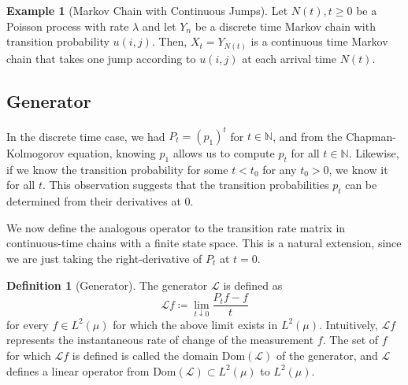 \documentclass{article}
\theoremstyle{definition}
\newtheorem{example}{Example}[section]
\theoremstyle{remark}
\theoremstyle{definition}
\newtheorem{definition}{Definition}[section]
\begin{document}
  \begin{example}[Markov Chain with Continuous Jumps]
  Let $N(t), t \geq 0$ be a Poisson process with rate $\lambda$ and let $Y_n$ be a discrete time Markov chain with transition probability $u(i, j)$. Then, $X_t = Y_{N(t)}$ is a continuous time Markov chain that takes one jump according to $u(i, j)$ at each arrival time $N(t)$. 
  \end{example}


  \subsection{Generator}

    In the discrete time case, we had $P_t = (p_1)^t$ for $t \in \mathbb{N}$, and from the Chapman-Kolmogorov equation, knowing $p_1$ allows us to compute $p_t$ for all $t \in \mathbb{N}$. Likewise, if we know the transition probability for some $t < t_0$ for any $t_0 > 0$, we know it for all $t$. This observation suggests that the transition probabilities $p_t$ can be determined from their derivatives at $0$. 

    We now define the analogous operator to the transition rate matrix in continuous-time chains with a finite state space. This is a natural extension, since we are just taking the right-derivative of $P_t$ at $t = 0$. 

    \begin{definition}[Generator]
    The generator $\mathscr{L}$ is defined as 
    \[\mathscr{L} f \coloneqq \lim_{t \downarrow 0} \frac{P_t f - f}{t}\]
    for every $f \in L^2 (\mu)$ for which the above limit exists in $L^2 (\mu)$. Intuitively, $\mathscr{L} f$ represents the instantaneous rate of change of the measurement $f$. The set of $f$ for which $\mathscr{L}f$ is defined is called the domain $\mathrm{Dom}(\mathscr{L})$ of the generator, and $\mathscr{L}$ defines a linear operator from $\mathrm{Dom}(\mathscr{L}) \subset L^2 (\mu)$ to $L^2 (\mu)$. 
    \end{definition}
\end{document}
